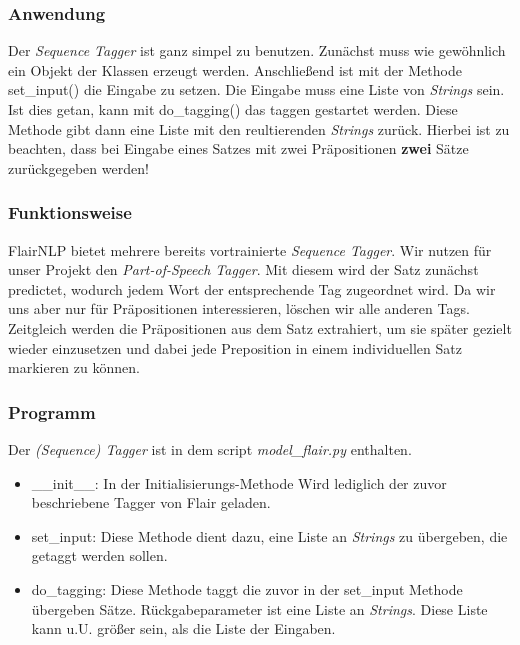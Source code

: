 \documentclass[10pt,a4paper]{article}
\begin{document}
\subsubsection{Anwendung}
\begin{flushleft}
Der \textit{Sequence Tagger} ist ganz simpel zu benutzen. Zunächst muss wie gewöhnlich ein Objekt der Klassen erzeugt werden. Anschließend ist mit der Methode set\_input() die Eingabe zu setzen. Die Eingabe muss eine Liste von \textit{Strings} sein. Ist dies getan, kann mit do\_tagging() das taggen gestartet werden. Diese Methode gibt dann eine Liste mit den reultierenden \textit{Strings} zurück. Hierbei ist zu beachten, dass bei Eingabe eines Satzes mit zwei Präpositionen \textbf{zwei} Sätze zurückgegeben werden!
\end{flushleft}

\subsubsection{Funktionsweise}
\begin{flushleft}
FlairNLP bietet mehrere bereits vortrainierte \textit{Sequence Tagger}. Wir nutzen für unser Projekt den \textit{Part-of-Speech Tagger}. Mit diesem wird der Satz zunächst predictet, wodurch jedem Wort der entsprechende Tag zugeordnet wird. Da wir uns aber nur für Präpositionen interessieren, löschen wir alle anderen Tags. Zeitgleich werden die Präpositionen aus dem Satz extrahiert, um sie später gezielt wieder einzusetzen und dabei jede Preposition in einem individuellen Satz markieren zu können.
\end{flushleft}

\subsubsection{Programm}
\begin{flushleft}
Der \textit{(Sequence) Tagger} ist in dem script \textit{model\_flair.py} enthalten.
\end{flushleft}
\begin{itemize}
\item \_\_init\_\_: In der Initialisierungs-Methode Wird lediglich der zuvor beschriebene Tagger von Flair geladen.
\item set\_input: Diese Methode dient dazu, eine Liste an \textit{Strings} zu übergeben, die getaggt werden sollen.
\item do\_tagging: Diese Methode taggt die zuvor in der set\_input Methode übergeben Sätze. Rückgabeparameter ist eine Liste an \textit{Strings}. Diese Liste kann u.U. größer sein, als die Liste der Eingaben.
\end{itemize}
\end{document}

